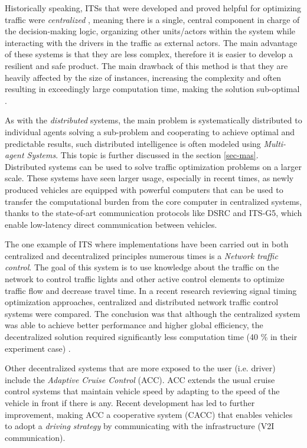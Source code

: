 \documentclass[0main.tex]{subfiles}
\begin{document}
Historically speaking, ITSs that were
developed and proved helpful for optimizing traffic were \emph{centralized} \cite{Corman2010}, meaning there is a
single, central component in charge of the decision-making logic, organizing other units/actors within the
system while interacting with the drivers in the traffic as external actors. The main
advantage of these systems is that they are less complex, therefore it is easier to develop a resilient and
safe product. The main drawback of this method is that they are heavily affected by the size
of instances, increasing the complexity and often resulting in exceedingly large computation time,
making the solution sub-optimal \cite{Corman2010}. 

As with the \emph{distributed} systems, the main problem is systematically distributed to
individual agents solving a sub-problem and cooperating to achieve optimal and predictable
results, such distributed intelligence is often modeled using \emph{Multi-agent Systems}.  This
topic is further discussed in the section \ref{sec-mas}. Distributed systems can be used to
solve traffic optimization problems on a larger scale. These systems have seen larger usage,
especially in recent times, as newly produced vehicles are equipped with powerful computers
that can be used to transfer the computational burden from the core computer in centralized
systems, thanks to the state-of-art communication protocols like DSRC and ITS-G5, which enable
low-latency direct communication between vehicles. 

The one example of ITS where implementations have been carried out in both centralized and 
decentralized principles numerous times is a \emph{Network traffic control}. The goal of this 
system is to use knowledge about the traffic on the network to control traffic lights and other 
active control elements to optimize traffic flow and decrease travel time. In a recent research 
reviewing signal timing optimization approaches, centralized and distributed network traffic
control systems were compared. The conclusion was that although the centralized system was able
to achieve better performance and higher global efficiency, the decentralized solution required
significantly less computation time (40 \% in their experiment case) \cite{Chow2019}.

Other decentralized systems that are more exposed to the user (i.e. driver) include the 
\emph{Adaptive Cruise Control} (ACC). ACC extends the usual cruise control systems 
that maintain vehicle speed by adapting to the speed of the vehicle in front if there is any.  
Recent development has led to further improvement, making ACC a cooperative system (CACC) that 
enables vehicles to adopt a \emph{driving strategy} by communicating with the infrastructure (V2I 
communication).
\end{document}
